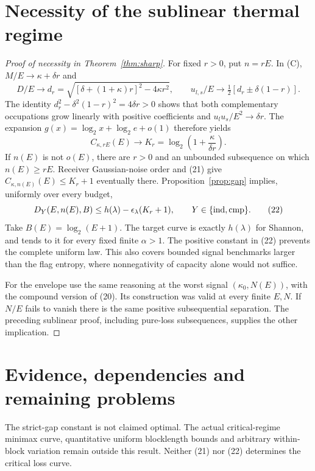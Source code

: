 \documentclass[11pt]{article}
\newcommand{\cmp}{\mathrm{cmp}}
\begin{document}
\section{Necessity of the sublinear thermal regime}
\begin{proof}[Proof of necessity in Theorem~\ref{thm:sharp}]
For fixed \(r>0\), put \(n=rE\). In (C), \(M/E\to\kappa+\delta r\) and
\[
 D/E\to d_r=\sqrt{[\delta+(1+\kappa)r]^2-4\kappa r^2},
 \qquad
 u_{l,s}/E\to\tfrac12[d_r\mathbin{\pm}\delta(1-r)].
\]
The identity \(d_r^2-\delta^2(1-r)^2=4\delta r>0\)
shows that both complementary occupations grow linearly with
positive coefficients and \(u_lu_s/E^2\to\delta r\).
The expansion \(g(x)=\log_2x+\log_2e+o(1)\) therefore yields
\[
 C_{\kappa,rE}(E)\longrightarrow
 K_r=\log_2\left(1+\frac{\kappa}{\delta r}\right).     \tag{21}
\]
If \(n(E)\) is not \(o(E)\), there are \(r>0\) and an unbounded
subsequence on which \(n(E)\ge rE\).
Receiver Gaussian-noise order and (21) give
\(C_{\kappa,n(E)}(E)\le K_r+1\) eventually there.
Proposition~\ref{prop:gap} implies, uniformly over every budget,
\[
 D_Y(E,n(E),B)
 \le h(\lambda)-\epsilon_\lambda(K_r+1),
 \qquad Y\in\{{\rm ind},\cmp\}.                     \tag{22}
\]
Take \(B(E)=\log_2(E+1)\). The target curve is exactly \(h(\lambda)\)
for Shannon, and tends to it for every fixed finite \(\alpha>1\).
The positive constant in (22) prevents the complete uniform law.
This also covers bounded signal benchmarks larger than the flag
entropy, where nonnegativity of capacity alone would not suffice.

For the envelope use the same reasoning at the worst signal
\((\kappa_0,N(E))\), with the compound version of (20).
Its construction was valid at every finite \(E,N\).
If \(N/E\) fails to vanish there is the same positive subsequential
separation. The preceding sublinear proof, including pure-loss
subsequences, supplies the other implication.
\end{proof}

\section{Evidence, dependencies and remaining problems}
The strict-gap constant is not claimed optimal. The actual
critical-regime minimax curve, quantitative uniform blocklength bounds
and arbitrary within-block variation remain outside this result.
Neither (21) nor (22) determines the critical loss curve.
\end{document}
